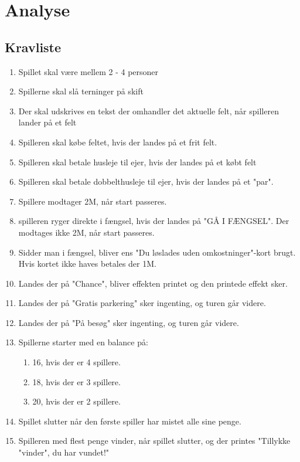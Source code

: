 \section{Analyse}
        
    
    \subsection{Kravliste}
        \begin{enumerate}
            \item Spillet skal være mellem 2 - 4 personer
            \item Spillerne skal slå terninger på skift
            \item Der skal udskrives en tekst der omhandler det aktuelle felt, når spilleren lander på et felt
            \item Spilleren skal købe feltet, hvis der landes på et frit felt.
            \item Spilleren skal betale husleje til ejer, hvis der landes på et købt felt
            \item Spilleren skal betale dobbelthusleje til ejer, hvis der landes på et "par".
            \item Spillere modtager 2M, når start passeres.
            \item spilleren ryger direkte i fængsel, hvis der landes på "GÅ I FÆNGSEL". Der modtages ikke 2M, når start passeres.
            \item Sidder man i fængsel, bliver ens "Du løslades uden omkostninger"-kort brugt. Hvis kortet ikke haves betales der 1M.
            \item Landes der på "Chance", bliver effekten printet og den printede effekt sker.
            \item Landes der på "Gratis parkering" sker ingenting, og turen går videre.
            \item Landes der på "På besøg" sker ingenting, og turen går videre.

            \item Spillerne starter med en balance på:
            \begin{enumerate}
                \item 16, hvis der er 4 spillere.
                \item 18, hvis der er 3 spillere.
                \item 20, hvis der er 2 spillere.
            \end{enumerate}
            \item Spillet slutter når den første spiller har mistet alle sine penge.
            \item Spilleren med flest penge vinder, når spillet slutter, og der printes "Tillykke "vinder", du har vundet!"


\end{enumerate}

